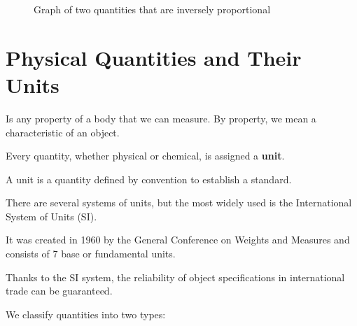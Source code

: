 \begin{enumerate}[label=\numberballmDarkTeal]
\begin{itemize}
            \begin{figure}[H]
                \centering
                \caption{Graph of two quantities that are inversely proportional}
            \end{figure}
        \end{itemize}
\end{enumerate}


\section{Physical Quantities and Their Units}

\begin{definition}
        Is any property of a body that we can measure.
        By property, we mean a characteristic of an object.
\end{definition}
\vspace*{-8pt}
Every quantity, whether physical or chemical, is assigned a \textbf{unit}.
\begin{definition}[Unit]
        A unit is a quantity defined by convention to establish a standard.
\end{definition}
\vspace*{6pt}
There are several systems of units, but the most widely used is the International System of Units (SI).

It was created in 1960 by the General Conference on Weights and Measures and consists of 7 base or fundamental units.

Thanks to the SI system, the reliability of object specifications in international trade can be guaranteed.

We classify quantities into two types:

